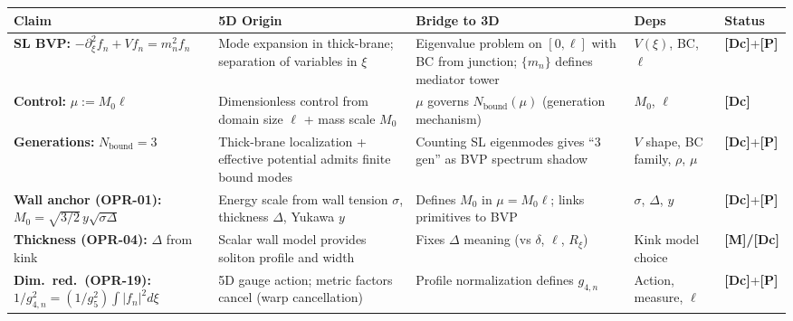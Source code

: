 \begin{tcolorbox}[breakable, enhanced, title={5D Origin Audit Table --- from 5D cause to 3D shadow (no new claims)}, colback=white, colframe=black, left=1mm, right=1mm, boxsep=1mm, width=\linewidth]
\tiny
\setlength{\tabcolsep}{1.5pt}
\renewcommand{\arraystretch}{1.2}

\noindent\begin{tabularx}{\linewidth}{@{}>{\raggedright\arraybackslash}p{2cm} >{\raggedright\arraybackslash}X >{\raggedright\arraybackslash}X >{\raggedright\arraybackslash}p{1.5cm} >{\raggedright\arraybackslash}p{1.5cm}@{}}
\toprule
\textbf{Claim} &
\textbf{5D Origin} &
\textbf{Bridge to 3D} &
\textbf{Deps} &
\textbf{Status} \\
\midrule

\textbf{SL BVP:} $-\partial_\xi^2 f_n + Vf_n = m_n^2 f_n$ &
Mode expansion in thick-brane; separation of variables in $\xi$ &
Eigenvalue problem on $[0,\ell]$ with BC from junction; $\{m_n\}$ defines mediator tower &
$V(\xi)$, BC, $\ell$ &
\textbf{[Dc]}+\textbf{[P]} \\
\midrule

\textbf{Control:} $\mu := M_0 \ell$ &
Dimensionless control from domain size $\ell$ + mass scale $M_0$ &
$\mu$ governs $N_{\text{bound}}(\mu)$ (generation mechanism) &
$M_0$, $\ell$ &
\textbf{[Dc]} \\
\midrule

\textbf{Generations:} $N_{\text{bound}}=3$ &
Thick-brane localization + effective potential admits finite bound modes &
Counting SL eigenmodes gives ``3 gen'' as BVP spectrum shadow &
$V$ shape, BC family, $\rho$, $\mu$ &
\textbf{[Dc]}+\textbf{[P]} \\
\midrule

\textbf{Wall anchor (OPR-01):} $M_0 = \sqrt{3/2}\,y\sqrt{\sigma\Delta}$ &
Energy scale from wall tension $\sigma$, thickness $\Delta$, Yukawa $y$ &
Defines $M_0$ in $\mu=M_0\ell$; links primitives to BVP &
$\sigma$, $\Delta$, $y$ &
\textbf{[Dc]}+\textbf{[P]} \\
\midrule

\textbf{Thickness (OPR-04):} $\Delta$ from kink &
Scalar wall model provides soliton profile and width &
Fixes $\Delta$ meaning (vs $\delta$, $\ell$, $R_\xi$) &
Kink model choice &
\textbf{[M]/[Dc]} \\
\midrule

\textbf{Dim.\ red.\ (OPR-19):} $1/g_{4,n}^2 = (1/g_5^2)\int|f_n|^2 d\xi$ &
5D gauge action; metric factors cancel (warp cancellation) &
Profile normalization defines $g_{4,n}$ &
Action, measure, $\ell$ &
\textbf{[Dc]}+\textbf{[P]} \\
\midrule


\end{tabularx}
\end{tcolorbox}
